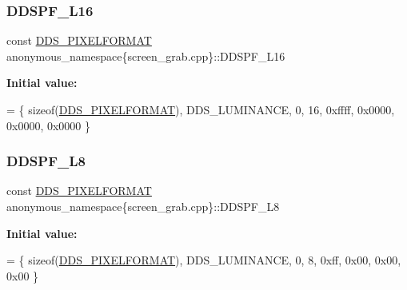 \subsubsection{\texorpdfstring{D\+D\+S\+P\+F\+\_\+\+L16}{DDSPF\_L16}}
{\footnotesize\ttfamily const \mbox{\hyperlink{structanonymous__namespace_02screen__grab_8cpp_03_1_1_d_d_s___p_i_x_e_l_f_o_r_m_a_t}{D\+D\+S\+\_\+\+P\+I\+X\+E\+L\+F\+O\+R\+M\+AT}} anonymous\+\_\+namespace\{screen\+\_\+grab.\+cpp\}\+::D\+D\+S\+P\+F\+\_\+\+L16}

{\bfseries Initial value\+:}
\begin{DoxyCode}
=
        \{ \textcolor{keyword}{sizeof}(\mbox{\hyperlink{struct_d_d_s___p_i_x_e_l_f_o_r_m_a_t}{DDS\_PIXELFORMAT}}), DDS\_LUMINANCE, 0, 16, 0xffff, 0x0000, 0x0000, 0x0000 \}
\end{DoxyCode}
\mbox{\label{namespaceanonymous__namespace_02screen__grab_8cpp_03_ae95ff1bbff9b37a8f0af3f81575e8045}} 
\subsubsection{\texorpdfstring{D\+D\+S\+P\+F\+\_\+\+L8}{DDSPF\_L8}}
{\footnotesize\ttfamily const \mbox{\hyperlink{structanonymous__namespace_02screen__grab_8cpp_03_1_1_d_d_s___p_i_x_e_l_f_o_r_m_a_t}{D\+D\+S\+\_\+\+P\+I\+X\+E\+L\+F\+O\+R\+M\+AT}} anonymous\+\_\+namespace\{screen\+\_\+grab.\+cpp\}\+::D\+D\+S\+P\+F\+\_\+\+L8}

{\bfseries Initial value\+:}
\begin{DoxyCode}
=
        \{ \textcolor{keyword}{sizeof}(\mbox{\hyperlink{struct_d_d_s___p_i_x_e_l_f_o_r_m_a_t}{DDS\_PIXELFORMAT}}), DDS\_LUMINANCE, 0,  8, 0xff, 0x00, 0x00, 0x00 \}
\end{DoxyCode}
\mbox{\label{namespaceanonymous__namespace_02screen__grab_8cpp_03_a9d815223ca5c0969126eaec8c2f50087}} 
